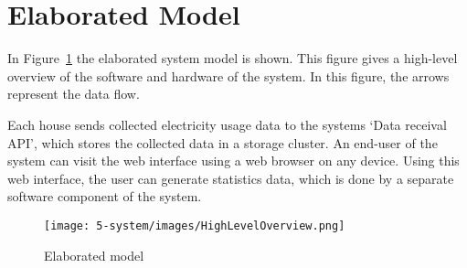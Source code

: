 \section{Elaborated Model}
\label{sec:elaboratedmodel}

In Figure~\ref{fig:elaboratedmodel} the elaborated system model is shown. This figure gives a high-level overview of the software and hardware of the system. In this figure, the arrows represent the data flow.

Each house sends collected electricity usage data to the systems `Data receival API', which stores the collected data in a storage cluster.
An end-user of the system can visit the web interface using a web browser on any device. Using this web interface, the user can generate statistics data, which is done by a separate software component of the system.


\begin{figure}[H]
	\centering
	\texttt{[image: 5-system/images/HighLevelOverview.png]}
	\caption{Elaborated model}
	\label{fig:elaboratedmodel}
\end{figure}

